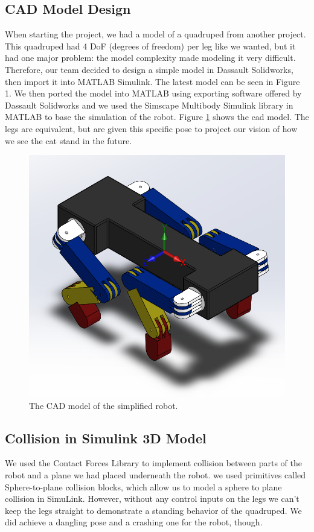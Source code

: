 \documentclass[letterpaper, 10 pt, conference]{ieeeconf}  %
\begin{document}
\subsection{CAD Model Design} \label{sec:CAD Model Design}
When starting the project, we had a model of a quadruped from another project. This quadruped had 4 DoF (degrees of freedom) per leg like we wanted, but it had one major problem: the model complexity made modeling it very difficult. Therefore, our team decided to design a simple model in Dassault Solidworks, then import it into MATLAB Simulink. The latest model can be seen in Figure 1.
We then ported the model into MATLAB using exporting software offered by  Dassault Solidworks and we used the Simscape Multibody Simulink library in MATLAB to base the simulation of the robot.
Figure \ref{fig:cadmodel} shows the cad model. The legs are equivalent, but are given this specific pose to project our vision of how we see the cat stand in the future.
\begin{figure}[thpb]
    \parbox{\linewidth}{\includegraphics[width=\linewidth]{robot.png}}
    \caption{The CAD model of the simplified robot.}
    \label{fig:cadmodel}
\end{figure}

\subsection{Collision in Simulink 3D Model}
We used the Contact Forces Library to implement collision between parts of the robot and a plane we had placed underneath the robot. we used primitives called Sphere-to-plane collision blocks, which allow us to model a sphere to plane collision in SimuLink. However, without any control inputs on the legs we can't keep the legs straight to demonstrate a standing behavior of the quadruped. We did achieve a dangling pose and a crashing one for the robot, though.
\end{document}
